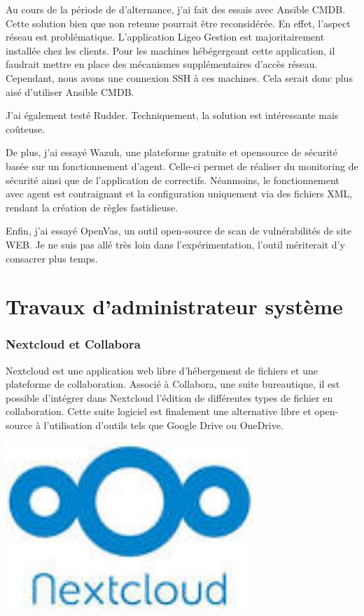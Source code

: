 \documentclass[12pt, a4paper, twoside]{article}
\begin{document}
Au cours de la période de d'alternance, j'ai fait des essais avec \gls{Ansible CMDB}. 
Cette solution bien que non retenue pourrait être reconsidérée. 
En effet, l'aspect réseau est problématique.
L'application Ligeo Gestion est majoritairement installée chez les clients.
Pour les machines hébégergeant cette application, il faudrait mettre en place des mécanismes supplémentaires d'accès réseau.
Cependant, nous avons une connexion SSH à ces machines.
Cela serait donc plus aisé d'utiliser \gls{Ansible CMDB}.

J'ai également testé Rudder.
Techniquement, la solution est intéressante mais coûteuse.

De plus, j'ai essayé Wazuh, une plateforme gratuite et opensource de sécurité basée sur un fonctionnement d'agent. 
Celle-ci permet de réaliser du monitoring de sécurité ainsi que de l'application de correctifs.
Néanmoins, le fonctionnement avec agent est contraignant et la configuration uniquement via des fichiers XML, rendant la création de règles fastidieuse.

Enfin, j'ai essayé OpenVas, un outil open-source de scan de vulnérabilités de site WEB.
Je ne suis pas allé très loin dans l'expérimentation, l'outil mériterait d'y consacrer plus temps.

\newpage
\part{Travaux d'administrateur système}
\label{part: Travaux d'administrateur système}
\section{Nextcloud et Collabora}
\noindent%
\begin{minipage}{.7\textwidth}%
\gls{Nextcloud} est une application web libre d'hébergement de fichiers et une plateforme de collaboration. 
Associé à \gls{Collabora}, une suite bureautique, il est possible d'intégrer dans \gls{Nextcloud} l'édition de différentes types de fichier en collaboration. 
Cette suite logiciel est finalement une alternative libre et open-source à l'utilisation d'outils tels que Google Drive ou OneDrive.
\end{minipage}%
\hfill
\begin{minipage}{.3\textwidth}%
\begin{center}
\includegraphics[width=0.7\textwidth]{src/logo_nextcloud.jpeg}
\end{center}
\end{minipage}%
\end{document}
